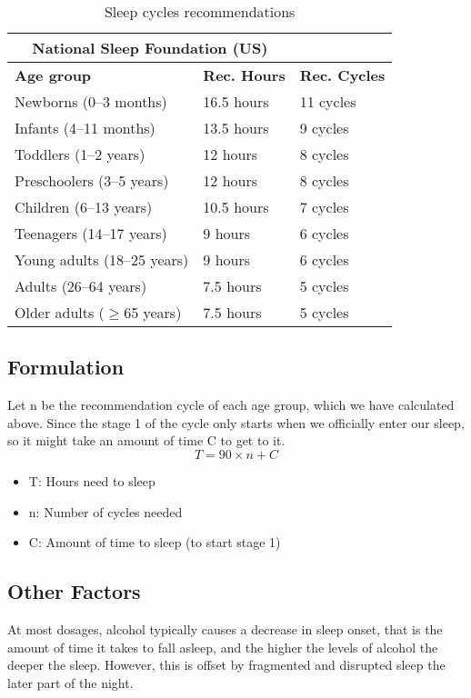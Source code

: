 \begin{table}[H]
\centering
\begin{tabular}{|l|l|l|}
\hline
\multicolumn{2}{|c|}{\textbf{National Sleep Foundation (US)}}\\
\hline
\textbf{Age group} & \textbf{Rec. Hours} & \textbf{Rec. Cycles}\\ \hline
Newborns (0–3 months) & 16.5 hours & 11 cycles\\ \hline
Infants (4–11 months) &	13.5 hours & 9 cycles\\ \hline
Toddlers (1–2 years) & 12 hours & 8 cycles\\ \hline
Preschoolers (3–5 years) & 12 hours & 8 cycles\\ \hline
Children (6–13 years) & 10.5 hours & 7 cycles\\ \hline
Teenagers (14–17 years) & 9 hours & 6 cycles\\ \hline
Young adults (18–25 years) & 9 hours & 6 cycles\\ \hline
Adults (26–64 years) & 7.5 hours & 5 cycles\\ \hline
Older adults ($\geq$65 years) & 7.5 hours & 5 cycles\\ \hline
\end{tabular}
\caption{Sleep cycles recommendations}
\label{tab:my_label_with_H_tag}
\end{table}

\subsection{Formulation}
Let n be the recommendation cycle of each age group, which we have calculated above. Since the stage 1 of the cycle only starts when we officially enter our sleep, so it might take an amount of time C to get to it.
$$
T = 90 \times n + C
$$
\begin{itemize}
    \item T: Hours need to sleep
    \item n: Number of cycles needed
    \item C: Amount of time to sleep (to start stage 1)
\end{itemize}

\subsection{Other Factors}
At most dosages, alcohol typically causes a decrease in sleep onset, that is the amount of time it takes to fall asleep, and the higher the levels of alcohol the deeper the sleep. However, this is offset by fragmented and disrupted sleep the later part of the night.\\

